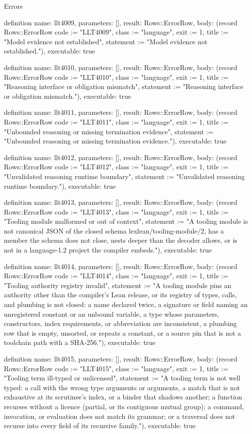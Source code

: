 \begin{lexlean}{Errors}
\begin{semanticmodule}
definition{
  name: llt4009,
  parameters: [],
  result: Rows::ErrorRow,
  body: (record Rows::ErrorRow {code := "LLT4009", class := "language", exit := 1, title := "Model evidence not established", statement := "Model evidence not established."}),
  executable: true
}

definition{
  name: llt4010,
  parameters: [],
  result: Rows::ErrorRow,
  body: (record Rows::ErrorRow {code := "LLT4010", class := "language", exit := 1, title := "Reasoning interface or obligation mismatch", statement := "Reasoning interface or obligation mismatch."}),
  executable: true
}

definition{
  name: llt4011,
  parameters: [],
  result: Rows::ErrorRow,
  body: (record Rows::ErrorRow {code := "LLT4011", class := "language", exit := 1, title := "Unbounded reasoning or missing termination evidence", statement := "Unbounded reasoning or missing termination evidence."}),
  executable: true
}

definition{
  name: llt4012,
  parameters: [],
  result: Rows::ErrorRow,
  body: (record Rows::ErrorRow {code := "LLT4012", class := "language", exit := 1, title := "Unvalidated reasoning runtime boundary", statement := "Unvalidated reasoning runtime boundary."}),
  executable: true
}

definition{
  name: llt4013,
  parameters: [],
  result: Rows::ErrorRow,
  body: (record Rows::ErrorRow {code := "LLT4013", class := "language", exit := 1, title := "Tooling module malformed or out of context", statement := "A tooling module is not canonical JSON of the closed schema lexlean/tooling-module/2, has a member the schema does not close, nests deeper than the decoder allows, or is not in a language-1.2 project the compiler embeds."}),
  executable: true
}

definition{
  name: llt4014,
  parameters: [],
  result: Rows::ErrorRow,
  body: (record Rows::ErrorRow {code := "LLT4014", class := "language", exit := 1, title := "Tooling authority registry invalid", statement := "A tooling module pins an authority other than the compiler's Lean release, or its registry of types, calls, and plumbing is not closed: a name declared twice, a signature or field naming an unregistered constant or an unbound variable, a type whose parameters, constructors, index requirements, or abbreviation are inconsistent, a plumbing row that is empty, unsorted, or repeats a constant, or a source pin that is not a toolchain path with a SHA-256."}),
  executable: true
}

definition{
  name: llt4015,
  parameters: [],
  result: Rows::ErrorRow,
  body: (record Rows::ErrorRow {code := "LLT4015", class := "language", exit := 1, title := "Tooling term ill-typed or unlicensed", statement := "A tooling term is not well typed: a call with the wrong type arguments or arguments, a match that is not exhaustive at its scrutinee's index, or a binder that shadows another; a function recurses without a licence (partial, or its contiguous mutual group); a command, invocation, or evaluation does not match its grammar; or a traversal does not recurse into every field of its recursive family."}),
  executable: true
}


\end{semanticmodule}
\end{lexlean}
